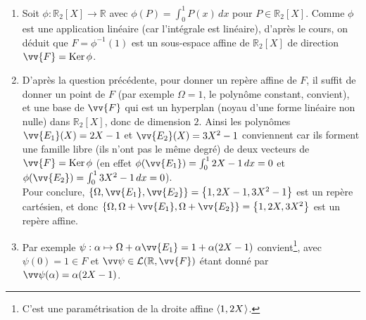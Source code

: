 \documentclass[a4paper,12pt,reqno]{amsart}
\begin{document}
\begin{solution}
  \begin{enumerate}
    \item Soit $\phi: \mathbb{R}_{2}[X] \longrightarrow \mathbb{R}$ avec $\phi(P) = \int_{0}^{1} P(x) \,dx$ pour $P \in \mathbb{R}_{2}[X]$. Comme $\phi$ est une application linéaire (car l'intégrale est linéaire), d'après le cours, on déduit que $F = \phi^{-1}(1)$ est un sous-espace affine de $\mathbb{R}_{2}[X]$ de direction $\vv{F} = \ker\phi$.
    \item D'après la question précédente, pour donner un repère affine de $F$, il suffit de donner un point de $F$ (par exemple $\Omega = 1$, le polynôme constant, convient), et une base de $\vv{F}$ qui est un hyperplan (noyau d'une forme linéaire non nulle) dans $\mathbb{R}_{2}[X]$, donc de dimension $2$. Ainsi les polynômes $\vv{E_{1}}(X) = 2X-1$ et $\vv{E_{2}}(X) = 3X^{2}-1$ conviennent car ils forment une famille libre (ils n'ont pas le même degré) de deux vecteurs de $\vv{F} = \ker\phi$ (en effet $\phi(\vv{E_{1}})=\int_{0}^{1} 2X-1 \,dx =0$ et $\phi(\vv{E_{2}}) = \int_{0}^{1} 3X^{2}-1 \,dx = 0$).\\
    Pour conclure, $\left\{ \Omega, \vv{E_{1}}, \vv{E_{2}} \right\} = \left\{ 1, 2X-1, 3X^{2}-1 \right\}$ est un repère cartésien, et donc $\left\{ \Omega, \Omega+\vv{E_{1}}, \Omega+\vv{E_{2}} \right\} = \left\{ 1, 2X, 3X^{2} \right\}$ est un repère affine.
    \item Par exemple $\psi : \alpha \mapsto \Omega + \alpha \vv{E_{1}} = 1+\alpha(2X-1)$ convient\footnote{C'est une paramétrisation de la droite affine $\langle{1,2X}\kern.07em\rangle$.}, avec $\psi(0)=1 \in F$ et $\vv\psi \in \mathcal{L}(\mathbb{R}, \vv{F})$ étant donné par $\vv\psi(\alpha) = \alpha(2X-1)$.
  \end{enumerate}
\end{solution}
\end{document}
